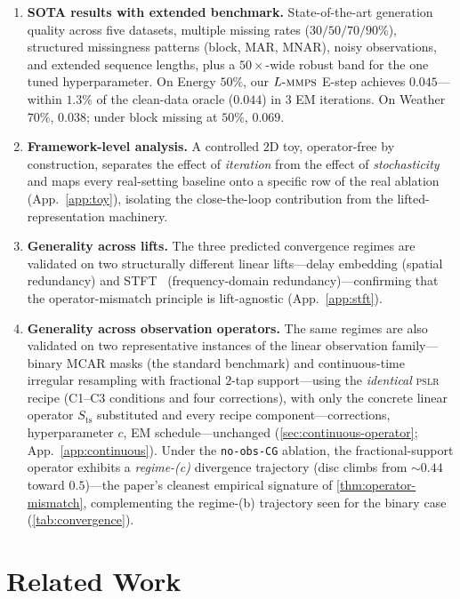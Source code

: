 \documentclass{article}
\theoremstyle{plain}
\theoremstyle{definition}
\theoremstyle{remark}
\newcommand{\pslr}{\textsc{pslr}}
\newcommand{\lmmps}{L\mbox{-}\textsc{mmps}}
\begin{document}
\begin{enumerate}
\item \textbf{SOTA results with extended benchmark.} State-of-the-art generation quality across five datasets, multiple missing rates ($30/50/70/90\%$), structured missingness patterns (block, MAR, MNAR), noisy observations, and extended sequence lengths, plus a $50\times$-wide robust band for the one tuned hyperparameter. On Energy $50\%$, our $\lmmps$ E-step achieves $0.045$---within $1.3\%$ of the clean-data oracle ($0.044$) in $3$ EM iterations. On Weather $70\%$, $0.038$; under block missing at $50\%$, $0.069$.
\item \textbf{Framework-level analysis.} A controlled $2$D toy, operator-free by construction, separates the effect of \emph{iteration} from the effect of \emph{stochasticity} and maps every real-setting baseline onto a specific row of the real ablation (App.~\ref{app:toy}), isolating the close-the-loop contribution from the lifted-representation machinery.
\item \textbf{Generality across lifts.} The three predicted convergence regimes are validated on two structurally different linear lifts---delay embedding (spatial redundancy) and STFT~\citep{griffin1984signal} (frequency-domain redundancy)---confirming that the operator-mismatch principle is lift-agnostic (App.~\ref{app:stft}).
\item \textbf{Generality across observation operators.} The same regimes are also validated on two representative instances of the linear observation family---binary MCAR masks (the standard benchmark) and continuous-time irregular resampling with fractional $2$-tap support---using the \emph{identical} \pslr{} recipe (C1--C3 conditions and four corrections), with only the concrete linear operator $S_{\mathrm{ts}}$ substituted and every recipe component---corrections, hyperparameter $c$, EM schedule---unchanged (\cref{sec:continuous-operator}; App.~\ref{app:continuous}). Under the \texttt{no-obs-CG} ablation, the fractional-support operator exhibits a \emph{regime-(c)} divergence trajectory (disc climbs from ${\sim}0.44$ toward $0.5$)---the paper's cleanest empirical signature of \cref{thm:operator-mismatch}, complementing the regime-(b) trajectory seen for the binary case (\cref{tab:convergence}).
\end{enumerate}

\vspace{-2mm}
\section{Related Work}
\label{sec:related}
\vspace{-1mm}
\end{document}
